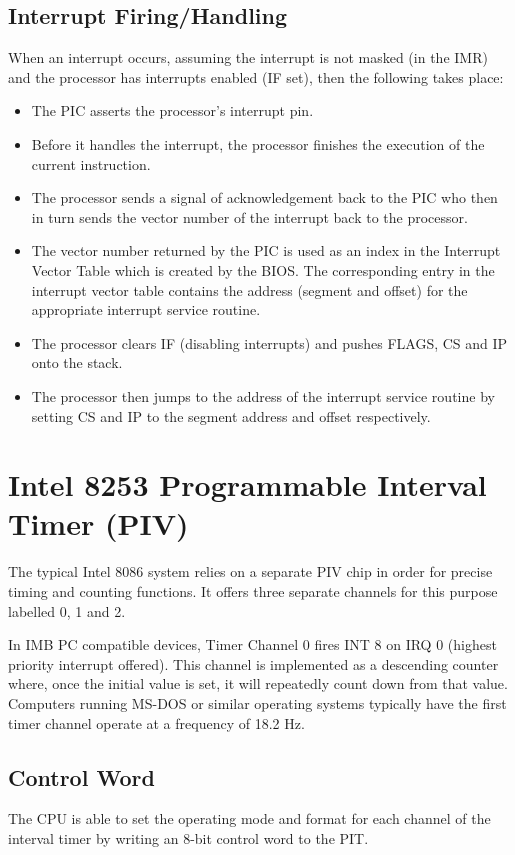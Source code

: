     \subsection{Interrupt Firing/Handling}
        When an interrupt occurs, assuming the interrupt is not masked (in the IMR) and the processor has interrupts enabled (IF set), then the following takes place:
        
        \begin{itemize}
            \item The PIC asserts the processor's interrupt pin.
            \item Before it handles the interrupt, the processor finishes the execution of the current instruction.
            \item The processor sends a signal of acknowledgement back to the PIC who then in turn sends the vector number of the interrupt back to the processor.
            \item The vector number returned by the PIC is used as an index in the Interrupt Vector Table which is created by the BIOS. The corresponding entry in the interrupt vector table contains the address (segment and offset) for the appropriate interrupt service routine.
            \item The processor clears IF (disabling interrupts) and pushes FLAGS, CS and IP onto the stack.
            \item The processor then jumps to the address of the interrupt service routine by setting CS and IP to the segment address and offset respectively.
        \end{itemize}

\section{Intel 8253 Programmable Interval Timer (PIV)}
    The typical Intel 8086 system relies on a separate PIV chip in order for precise timing and counting functions. It offers three separate channels for this purpose labelled 0, 1 and 2.

    In IMB PC compatible devices, Timer Channel 0 fires INT 8 on IRQ 0 (highest priority interrupt offered). This channel is implemented as a descending counter where, once the initial value is set, it will repeatedly count down from that value. Computers running MS-DOS or similar operating systems typically have the first timer channel operate at a frequency of 18.2 Hz.

    \subsection{Control Word}
        The CPU is able to set the operating mode and format for each channel of the interval timer by writing an 8-bit control word to the PIT.

